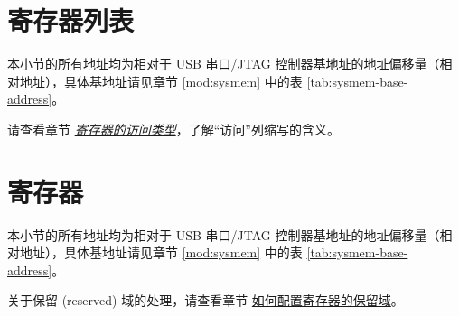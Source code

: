 \documentclass[main\_\_CN.tex]{subfiles}
\begin{document}



\newpage
\hypertarget{usbserialjtag-reg-summ}{}
\section{寄存器列表}
\label{sec:usbserialjtag-reg-summ}

本小节的所有地址均为相对于 USB 串口/JTAG 控制器基地址的地址偏移量（相对地址），具体基地址请见章节 \ref{mod:sysmem} \textit{} 中的表 \ref{tab:sysmem-base-address}。

请查看章节 \hyperref[glossary-access-types]{\textit{寄存器的访问类型}}，了解“访问”列缩写的含义。






\newpage
\section{寄存器}

本小节的所有地址均为相对于 USB 串口/JTAG 控制器基地址的地址偏移量（相对地址），具体基地址请见章节 \ref{mod:sysmem} \textit{} 中的表 \ref{tab:sysmem-base-address}。

关于保留 (reserved) 域的处理，请查看章节 \hyperref[programming-reserved-field]{如何配置寄存器的保留域}。


\end{document}
